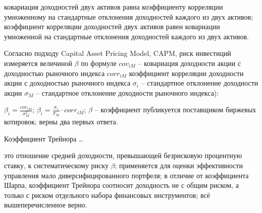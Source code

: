 \documentclass[12pt, table, twoside, a4paper]{exam}
\begin{document}
\begin{questions}
\begin{multicols}{2}
\begin{choices}
			\choice ковариация доходностей двух активов равна коэффициенту корреляции умноженному на стандартные отклонения доходностей каждого из двух активов;
			\choice коэффициент корреляции доходностей двух активов равен ковариации умноженной на стандартные отклонения доходностей каждого из двух активов.
		\end{choices}
		\question Согласно подходу Capital Asset Pricing Model, CAPM, риск инвестиций измеряется величиной $\beta$ по формуле $cov_{iM}$ – ковариация доходности акции с доходностью рыночного индекса $corr_{iM}$  коэффициент корреляции доходности акции с доходностью рыночного индекса $\sigma_i$ – стандартное отклонение доходности акции $\sigma_M$ – стандартное отклонение доходности рыночного индекса):
		\begin{choices}
			\CC $\beta_i=\frac{cov_{iM}}{\sigma_M^2}$;
			\choice $\beta_i=\frac{\sigma_i}{\sigma_M} \cdot corr_{iM}$;
			\choice $\beta$ – коэффициент публикуется поставщиком биржевых котировок;
			\choice верны два первых ответа.
		\end{choices}
		\question Коэффициент Трейнора …
		\begin{choices}
			\choice это отношение средней доходности, превышающей безрисковую процентную ставку, к систематическому риску $\beta$;
			\choice применяется для оценки эффективности управления мало диверсифицированного портфеля;
			\choice в отличие от коэффициента Шарпа, коэффициент Трейнора соотносит доходность не с общим риском, а только с риском отдельного набора финансовых инструментов;
			\CC всё вышеперечисленное верно.
		\end{choices}
		
	\end{multicols}
\end{questions}
\end{document}
